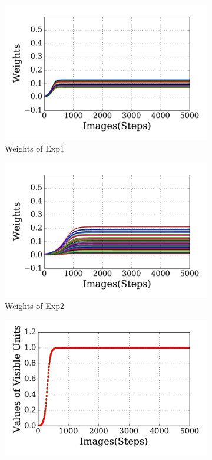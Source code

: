 \begin{figure}
	\centering
	\begin{subfigure}[t]{0.45\textwidth}
		\includegraphics[width=\textwidth]{pics_sdlm/20_exp_AE/exp1_weights_non.pdf}
		\caption{Weights of Exp1}
	\end{subfigure}
	\begin{subfigure}[t]{0.45\textwidth}
		\includegraphics[width=\textwidth]{pics_sdlm/20_exp_AE/exp2_weights_non.pdf}
		\caption{Weights of Exp2}
	\end{subfigure}
	\begin{subfigure}[t]{0.45\textwidth}
		\includegraphics[width=\textwidth]{pics_sdlm/20_exp_AE/exp1_recon_non.pdf}

\end{subfigure}
\end{figure}
